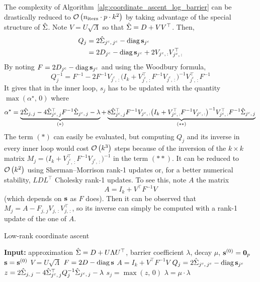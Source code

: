 The complexity of Algorithm~\ref{alg:coordinate_ascent_log_barrier} can be drastically reduced
to $\mathcal{O}\left( n_\text{iters} \cdot p \cdot k^2 \right)$
by taking advantage of the special structure of $\hat{\Sigma}$.
Note $V = U \sqrt{\Lambda}$ so that $\hat{\Sigma} = D + VV^\top$.
Then,
\begin{align*}
    Q_j &= 2\hat{\Sigma}_{j^c,\, j^c} - \operatorname*{diag}\mathbf{s}_{j^c}\\
    &= 2D_{j^c} - \operatorname*{diag}\mathbf{s}_{j^c} + 2V_{j^c,\, :}V_{j^c,\, :}^\top
\end{align*}
By noting $F = 2D_{j^c} - \operatorname*{diag}\mathbf{s}_{j^c}$ and using the Woodbury formula,
\begin{equation*}
    Q_j^{-1} =
        F^{-1} - 2F^{-1}V_{j^c,\, :}
            \big( I_k + V_{j^c,\, :}^\top F^{-1} V_{j^c,\, :} \big)^{-1}
                V_{j^c,\, :}^\top F^{-1}
\end{equation*}
It gives that in the inner loop, $s_j$ has to be updated with the quantity
$\max\left( \alpha^\star,\, 0 \right)$ where
\begin{equation*}
    \alpha^\star =
        \underbrace{
            2\hat{\Sigma}_{j,\, j}
            - 4\hat{\Sigma}_{j^c,\, j}^\top F^{-1} \hat{\Sigma}_{j^c,\, j}
            - \lambda
        }_\text{$(*)$}
        + \underbrace{
            8\hat{\Sigma}_{j^c,\, j}^\top F^{-1} V_{j^c,\, :}
            \big( I_k + V_{j^c,\, :}^\top F^{-1} V_{j^c,\, :} \big)^{-1}
            V_{j^c,\, :}^\top F^{-1}\hat{\Sigma}_{j^c,\, j}
        }_\text{$(**)$}\\
\end{equation*}
The term $(*)$ can easily be evaluated,
but computing $Q_j$ and its inverse in every inner loop would cost $\mathcal{O}\left( k^3 \right)$ steps
because of the inversion of the $k \times k$ matrix
$M_j = \big( I_k + V_{j^c,\, :}^\top F^{-1} V_{j^c,\, :} \big)^{-1}$
in the term $(**)$.
It can be reduced to $\mathcal{O}\left( k^2 \right)$ using Sherman–Morrison rank-1 updates or,
for a better numerical stability,
$LDL^\top$ Cholesky rank-1 updates.
To see this, note $A$ the matrix
\begin{equation*}
    A = I_k + V^\top F^{-1} V
\end{equation*}
(which depends on $\mathbf{s}$ as $F$ does).
Then it can be observed that $M_j = A - F_{j,\, j} V_{j,\, :}V_{j,\, :}^\top$,
so its inverse can simply be computed with a rank-1 update of the one of $A$.
\begin{algorithm}
    \caption{Low-rank coordinate ascent}\label{alg:low_rank_coordinate_ascent}
    \begin{algorithmic}[1]
        \State \textbf{Input:} approximation $\hat{\Sigma} = D + U \Lambda U^\top$, barrier coefficient $\lambda$,
            decay $\mu$, $\mathbf{s}^{(0)} = \mathbf{0}_p$
        \State $\mathbf{s} = \mathbf{s}^{(0)}$
        \State $V = U \sqrt{\Lambda}$
        \State $F = 2D - \operatorname*{diag}\mathbf{s}$
        \State $A = I_k + V^\top F^{-1} V$
        \Repeat
        \State $Q_j = 2\hat{\Sigma}_{j^c,\, j^c} - \operatorname*{diag}\mathbf{s}_{j^c}$
        \State $z = 2\hat{\Sigma}_{j,\, j} - 4\hat{\Sigma}_{j^c,\, j}^\top Q_j^{-1} \hat{\Sigma}_{j^c,\, j} - \lambda$
        \State $s_j = \max\left( z,\, 0 \right)$
        \EndFor
        \State $\lambda = \mu \cdot \lambda$
    \end{algorithmic}
\end{algorithm}
